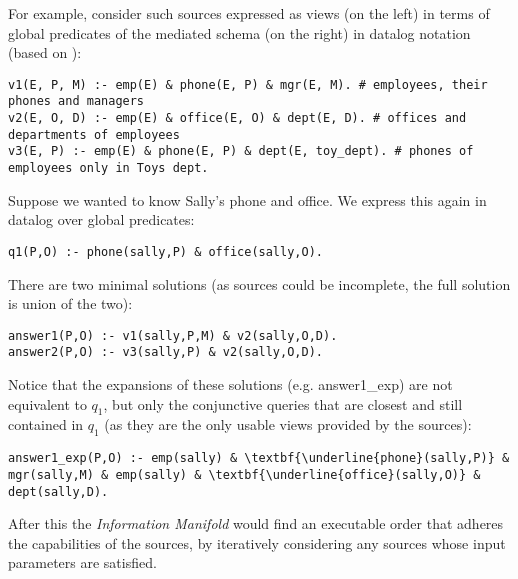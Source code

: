 For example, consider such sources expressed as views (on the left) in terms of global predicates of the mediated schema (on the right) in datalog notation (based on \cite{integr_views2000}):
%
{\small
\begin{verbatim}
v1(E, P, M) :- emp(E) & phone(E, P) & mgr(E, M). # employees, their phones and managers
v2(E, O, D) :- emp(E) & office(E, O) & dept(E, D). # offices and departments of employees
v3(E, P) :- emp(E) & phone(E, P) & dept(E, toy_dept). # phones of employees only in Toys dept.
\end{verbatim}
}
%
Suppose we wanted to know Sally's phone and office. We express this again in datalog over global predicates:
{\small\begin{verbatim}
q1(P,O) :- phone(sally,P) & office(sally,O).
\end{verbatim}}
There are two minimal solutions (as sources could be incomplete, the full solution is union of the two):
{\small
\begin{verbatim}
answer1(P,O) :- v1(sally,P,M) & v2(sally,O,D).
answer2(P,O) :- v3(sally,P) & v2(sally,O,D).
\end{verbatim}}
Notice that the expansions of these solutions (e.g. answer1\_exp) are not equivalent to $q_1$, but only the conjunctive queries that are closest and still contained in $q_1$ (as they are the only usable views provided by the sources):
{\footnotesize\begin{Verbatim}[commandchars=\\\{\}]
answer1_exp(P,O) :- emp(sally) & \textbf{\underline{phone}(sally,P)} & mgr(sally,M) & emp(sally) & \textbf{\underline{office}(sally,O)} & dept(sally,D).
\end{Verbatim}
}
After this the \textit{Information Manifold} would find an executable order that adheres the capabilities of the sources, by iteratively considering any sources whose input parameters are satisfied. 


